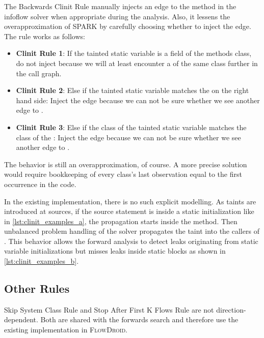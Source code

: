 \documentclass[../draft.tex]{subfiles}
\begin{document}
    The Backwards Clinit Rule manually injects an edge to the  method in the infoflow solver when appropriate during the analysis.
    Also, it lessens the overapproximation of SPARK by carefully choosing whether to inject the edge. The rule works as follows:
    \begin{itemize}
        \item \textbf{Clinit Rule 1}: If the tainted static variable is a field of the methods class, do not inject because we will at least encounter a  of the same class further in the call graph.
        \item \textbf{Clinit Rule 2}: Else if the tainted static variable matches the  on the right hand side: Inject the edge because we can not be sure whether we see another edge to .
        \item \textbf{Clinit Rule 3}: Else if the class of the tainted static variable matches the class of the : Inject the edge because we can not be sure whether we see another edge to .
    \end{itemize}
    The behavior is still an overapproximation, of course.
    A more precise solution would require bookkeeping of every class's last observation equal to the first occurrence in the code.

    In the existing implementation, there is no such explicit modelling.
    As taints are introduced at sources, if the source statement is inside a static initialization like in \autoref{lst:clinit_examples_a}, the propagation starts inside the  method.
    Then unbalanced problem handling of the solver propagates the taint into the callers of .
    This behavior allows the forward analysis to detect leaks originating from static variable initializations but misses leaks inside static blocks as shown in \autoref{lst:clinit_examples_b}.

    \subsection{Other Rules}
    Skip System Class Rule and Stop After First K Flows Rule are not direction-dependent.
    Both are shared with the forwards search and therefore use the existing implementation in \textsc{FlowDroid}.

\end{document}
